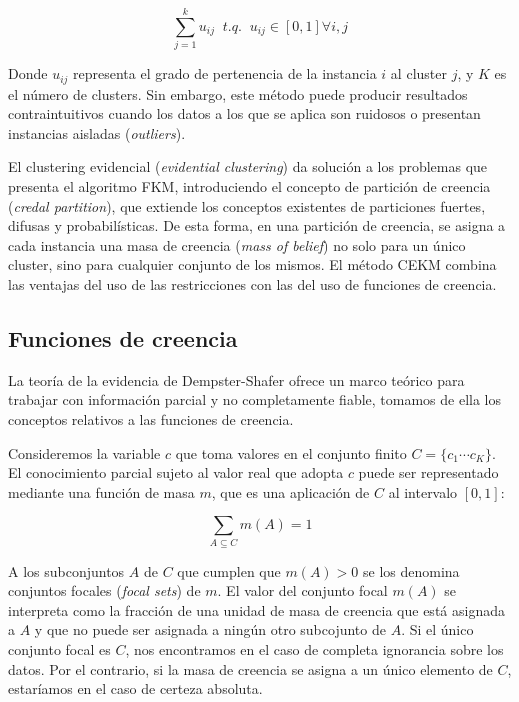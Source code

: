 \begin{equation}
\sum_{j=1}^{k} u_{ij} \;\; t.q. \;\; u_{ij} \in [0,1] \forall i,j
\label{eqn2}
\end{equation}

Donde $u_{ij}$ representa el grado de pertenencia de la instancia $i$ al cluster $j$, y $K$ es el número de clusters. Sin embargo, este método puede producir resultados contraintuitivos cuando los datos a los que se aplica son ruidosos o presentan instancias aisladas (\textit{outliers}).

El clustering evidencial (\textit{evidential clustering}) da solución a los problemas que presenta el algoritmo \acs{FKM}, introduciendo el concepto de partición de creencia (\textit{credal partition}), que extiende los conceptos existentes de particiones fuertes, difusas y probabilísticas. De esta forma, en una partición de creencia, se asigna a cada instancia una masa de creencia (\textit{mass of belief}) no solo para un único cluster, sino para cualquier conjunto de los mismos. El método \acs{CEKM} combina las ventajas del uso de las restricciones con las del uso de funciones de creencia.

\subsection{Funciones de creencia}

La teoría de la evidencia de Dempster-Shafer ofrece un marco teórico para trabajar con información parcial y no completamente fiable, tomamos de ella los conceptos relativos a las funciones de creencia.

Consideremos la variable $c$ que toma valores en el conjunto finito $C = \{c_1 \cdots c_K \}$. El conocimiento parcial sujeto al valor real que adopta $c$ puede ser representado mediante una función de masa $m$, que es una aplicación de $C$ al intervalo $[0,1]$:

\begin{equation}
\sum_{A \subseteq C} m(A) = 1
\label{eqn3}
\end{equation}

A los subconjuntos $A$ de $C$ que cumplen que $m(A) > 0$ se los denomina conjuntos focales (\textit{focal sets}) de $m$. El valor del conjunto focal $m(A)$ se interpreta como la fracción de una unidad de masa de creencia que está asignada a $A$ y que no puede ser asignada a ningún otro subcojunto de $A$. Si el único conjunto focal es $C$, nos encontramos en el caso de completa ignorancia sobre los datos. Por el contrario, si la masa de creencia se asigna a un único elemento de $C$, estaríamos en el caso de certeza absoluta.

